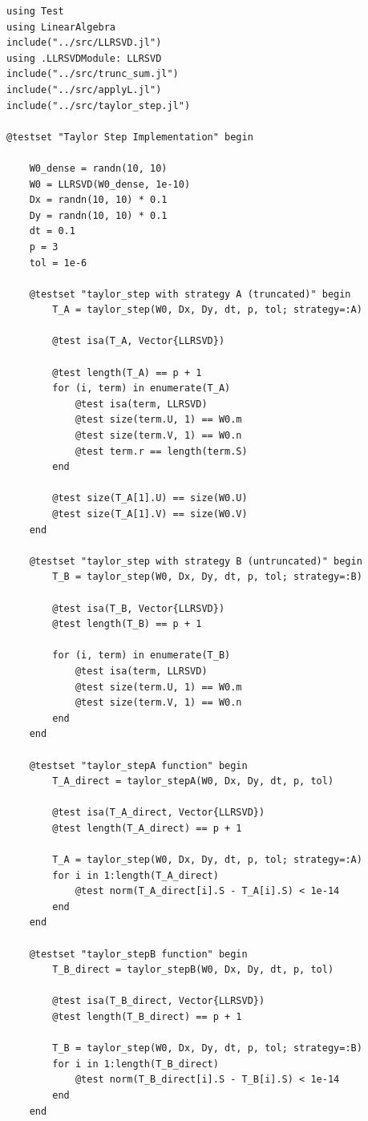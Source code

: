\documentclass[11pt]{report}
\begin{document}
\begin{lstlisting}
using Test
using LinearAlgebra
include("../src/LLRSVD.jl")
using .LLRSVDModule: LLRSVD
include("../src/trunc_sum.jl")
include("../src/applyL.jl")
include("../src/taylor_step.jl")

@testset "Taylor Step Implementation" begin
    
    W0_dense = randn(10, 10)
    W0 = LLRSVD(W0_dense, 1e-10)
    Dx = randn(10, 10) * 0.1
    Dy = randn(10, 10) * 0.1
    dt = 0.1
    p = 3
    tol = 1e-6

    @testset "taylor_step with strategy A (truncated)" begin
        T_A = taylor_step(W0, Dx, Dy, dt, p, tol; strategy=:A)
        
        @test isa(T_A, Vector{LLRSVD})
        
        @test length(T_A) == p + 1
        for (i, term) in enumerate(T_A)
            @test isa(term, LLRSVD)
            @test size(term.U, 1) == W0.m
            @test size(term.V, 1) == W0.n
            @test term.r == length(term.S)
        end
        
        @test size(T_A[1].U) == size(W0.U)
        @test size(T_A[1].V) == size(W0.V)
    end

    @testset "taylor_step with strategy B (untruncated)" begin
        T_B = taylor_step(W0, Dx, Dy, dt, p, tol; strategy=:B)
        
        @test isa(T_B, Vector{LLRSVD})
        @test length(T_B) == p + 1
        
        for (i, term) in enumerate(T_B)
            @test isa(term, LLRSVD)
            @test size(term.U, 1) == W0.m
            @test size(term.V, 1) == W0.n
        end
    end

    @testset "taylor_stepA function" begin
        T_A_direct = taylor_stepA(W0, Dx, Dy, dt, p, tol)
        
        @test isa(T_A_direct, Vector{LLRSVD})
        @test length(T_A_direct) == p + 1
        
        T_A = taylor_step(W0, Dx, Dy, dt, p, tol; strategy=:A)
        for i in 1:length(T_A_direct)
            @test norm(T_A_direct[i].S - T_A[i].S) < 1e-14
        end
    end

    @testset "taylor_stepB function" begin
        T_B_direct = taylor_stepB(W0, Dx, Dy, dt, p, tol)
        
        @test isa(T_B_direct, Vector{LLRSVD})
        @test length(T_B_direct) == p + 1
        
        T_B = taylor_step(W0, Dx, Dy, dt, p, tol; strategy=:B)
        for i in 1:length(T_B_direct)
            @test norm(T_B_direct[i].S - T_B[i].S) < 1e-14
        end
    end


\end{lstlisting}
\end{document}
